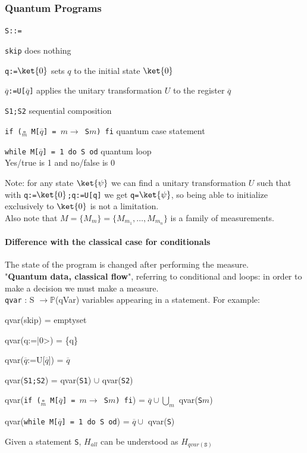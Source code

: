 \documentclass[10pt]{report}
\begin{document}
\subsubsection{Quantum Programs}
\texttt{S::=}
\begin{list}{}{}
	\item \texttt{skip} does nothing
	\item \texttt{q:=$\ket{0}$} sets $q$ to the initial state $\ket{0}$
	\item \texttt{$\overline{q}$:=U[$\overline{q}$]} applies the unitary transformation $U$ to the register $\overline{q}$
	\item \texttt{S1;S2} sequential composition
	\item \texttt{if ($\underset{m}{\square}$ M[$\overline{q}$] = $m\rightarrow$ S$m$) fi} quantum case statement %
	\item \texttt{while M[$\overline{q}$] = 1 do S od} quantum loop\\
	Yes/true is 1 and no/false is 0
\end{list}
Note: for any state $\ket{\psi}$ we can find a unitary transformation $U$ such that with \texttt{q:=$\ket{0}$;q:=U[q]} we get \texttt{q=$\ket{\psi}$}, so being able to initialize exclusively to $\ket{0}$ is not a limitation.\\
Also note that $M = \{M_m\} = \{M_{m_1},\ldots,M_{m_n}\}$ is a family of measurements.
\paragraph{Difference with the classical case for conditionals} The state of the program is changed after performing the measure.\\
"\textbf{Quantum data, classical flow}", referring to conditional and loops: in order to make a decision we must make a measure.\\
\texttt{qvar} : S $\rightarrow \mathbb{P}$(qVar) variables appearing in a statement. For example:
\begin{list}{}{}
	\item qvar(skip) = emptyset
	\item qvar(q:=|0>) = \{q\}
	\item qvar($\overline{q}$:=U[$\overline{q}$]) = $\overline{q}$
	\item qvar(\texttt{S1;S2}) = qvar(\texttt{S1}) $\cup$ qvar(\texttt{S2})
	\item qvar(\texttt{if ($\underset{m}{\square}$ M[$\overline{q}$] = $m\rightarrow$ S$m$) fi}) = $\overline{q}\cup\bigcup_m$ qvar(\texttt{S$m$})
	\item qvar(\texttt{while M[$\overline{q}$] = 1 do S od}) = $\overline{q}\cup$ qvar(\texttt{S})
\end{list}
Given a statement \texttt{S}, $H_{all}$ can be understood as $H_{qvar(\texttt{S})}$
\end{document}
